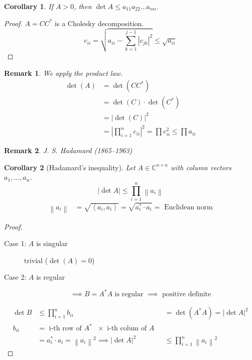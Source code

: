 \documentclass{article}
\newtheorem{remark}{Remark}  \numberwithin{remark}{section}
\newtheorem{corollary}{Corollary}  \numberwithin{corollary}{section}
\newcommand{\angel}[1]{\left\langle#1\right\rangle}
\newcommand{\norm}[1]{\left\|#1\right\|}
\newcommand{\card}[1]{\left|#1\right|}
\begin{document}
\begin{corollary} %
  If $A > 0$, then $\det{A} \leq a_{11} a_{22} \dots a_{nn}$.
\end{corollary}

\begin{proof}
  $A = CC^*$ is a Cholesky decomposition.
  \[ c_{ii} = \sqrt{a_{ii} - \sum_{k=1}^{j-1} \card{c_{jk}}^2} \leq \sqrt{a_{ii}} \]
\end{proof}

\begin{remark}
  We apply the product law.
  \begin{align*}
    \det(A) &= \det(C C^*) \\
      &= \det(C) \cdot \det(C^*) \\
      &= \card{\det(C)}^2 \\
      &= \card{\prod_{i=1}^n c_{ii}}^2 = \prod c_{ii}^2 \leq \prod a_{ii}
  \end{align*}
\end{remark}

\begin{remark}
  J. S. Hadamard (1865--1963)
\end{remark}

\begin{corollary}[Hadamard's inequality] %
  Let $A \in \mathbb C^{n \times n}$ with column vectors $a_1, \dots, a_n$.
  \[ \card{\det{A}} \leq \prod_{i=1}^n \norm{a_{i}} \]
  \begin{align*}
    \norm{a_i} &= \sqrt{\angel{a_i, a_i}} = \sqrt{a_i^* \cdot a_i} = \text{ Euclidean norm}
  \end{align*}
\end{corollary}

\begin{proof}
  \begin{description}
    \item[Case 1: $A$ is singular]
      trivial ($\det(A) = 0$)
    \item[Case 2: $A$ is regular]
      \[ \implies B = A^* A \text{ is regular } \implies \text{ positive definite} \]
  \end{description}
  \begin{align*}
    \det{B} &\leq \prod_{i=1}^n b_{ii}
            &= \det(A^* A) = \card{\det{A}}^2 \\
    b_{ii}  &= \text{ i-th row of $A^*$ } \times \text{ i-th colum of $A$ } \\
            &= a_i^* \cdot a_i = \norm{a_i}^2
    \implies \card{\det{A}}^2 &\leq \prod_{i=1}^n \norm{a_i}^2
  \end{align*}
\end{proof}
\end{document}
